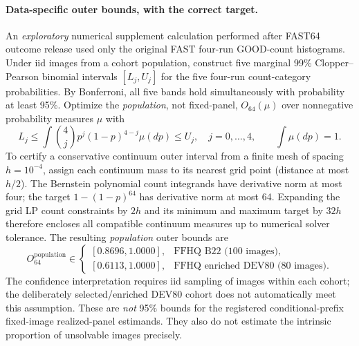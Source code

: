 \paragraph{Data-specific outer bounds, with the correct target.}
An \emph{exploratory} numerical supplement calculation performed
after FAST64 outcome release used only the original FAST four-run
GOOD-count histograms. Under iid images from a cohort population,
construct five marginal 99\% Clopper--Pearson binomial intervals
$[L_j,U_j]$ for the five four-run count-category probabilities.
By Bonferroni, all five bands hold simultaneously with probability
at least 95\%. Optimize the \emph{population}, not fixed-panel,
$O_{64}(\mu)$ over nonnegative probability measures $\mu$ with
\[
 L_j\le\int\binom4j p^j(1-p)^{4-j}\mu(dp)\le U_j,
 \quad j=0,\ldots,4,\qquad\int\mu(dp)=1.
\]
To certify a conservative continuum outer interval from a finite
mesh of spacing $h=10^{-4}$, assign each continuum mass to its
nearest grid point (distance at most $h/2$). The Bernstein
polynomial count integrands have derivative norm at most four;
the target $1-(1-p)^{64}$ has derivative norm at most 64.
Expanding the grid LP count constraints by $2h$ and its minimum and
maximum target by $32h$ therefore encloses all compatible
continuum measures up to numerical solver tolerance. The resulting
\emph{population} outer bounds are
\begin{equation}\label{eq:suppl-population-bounds}
 O_{64}^{\mathrm{population}}\in
 \begin{cases}
 [0.8696,1.0000],&\text{FFHQ B22 (100 images)},\\
 [0.6113,1.0000],&\text{FFHQ enriched DEV80 (80 images)}.
 \end{cases}
\end{equation}
The confidence interpretation requires iid sampling of images
within each cohort; the deliberately selected/enriched DEV80
cohort does not automatically meet this assumption. These are
\emph{not} 95\% bounds for the registered conditional-prefix
fixed-image realized-panel estimands. They also do not estimate
the intrinsic proportion of unsolvable images precisely.

